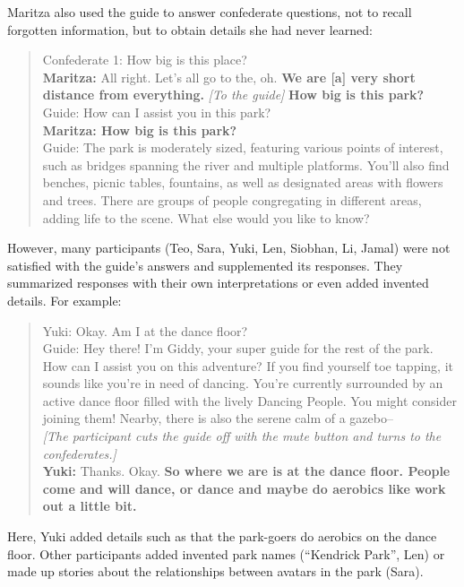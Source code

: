 Maritza also used the guide to answer confederate questions, not to recall forgotten information, but to obtain details she had never learned:

\begin{quote}
Confederate 1: How big is this place?\\
\textbf{Maritza:} All right. Let's all go to the, oh. \textbf{We are [a] very short distance from everything.} \textit{[To the guide]} \textbf{How big is this park?}\\
Guide: How can I assist you in this park?\\
\textbf{Maritza: How big is this park?}\\
Guide: The park is moderately sized, featuring various points of interest, such as bridges spanning the river and multiple platforms. You'll also find benches, picnic tables, fountains, as well as designated areas with flowers and trees. There are groups of people congregating in different areas, adding life to the scene. What else would you like to know?
\end{quote}

However, many participants (Teo, Sara, Yuki, Len, Siobhan, Li, Jamal) were not satisfied with the guide’s answers and supplemented its responses. They summarized responses with their own interpretations or even added invented details. For example:

\begin{quote}
Yuki: Okay. Am I at the dance floor?\\
Guide: Hey there! I'm Giddy, your super guide for the rest of the park. How can I assist you on this adventure? If you find yourself toe tapping, it sounds like you're in need of dancing. You're currently surrounded by an active dance floor filled with the lively Dancing People. You might consider joining them! Nearby, there is also the serene calm of a gazebo–\\
\textit{[The participant cuts the guide off with the mute button and turns to the confederates.]}\\
\textbf{Yuki:} Thanks. Okay. \textbf{So where we are is at the dance floor. People come and will dance, or dance and maybe do aerobics like work out a little bit.}
\end{quote}

Here, Yuki added details such as that the park-goers do aerobics on the dance floor. Other participants added invented park names (“Kendrick Park”, Len) or made up stories about the relationships between avatars in the park (Sara).

